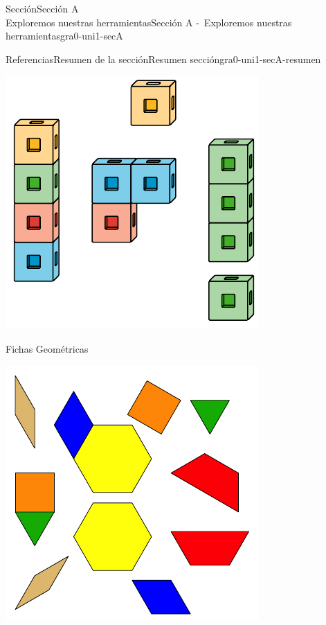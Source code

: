 \begin{sectionptx}{Sección}{{\Large Sección A\\}Exploremos nuestras herramientas}{}{Sección A -~Exploremos nuestras herramientas}{}{}{gra0-uni1-secA}
\begin{references-subsection}{Referencias}{Resumen de la sección}{}{Resumen sección}{}{}{gra0-uni1-secA-resumen}
\begin{sidebyside}{2}{0.05}{0.05}{0.1}
\begin{sbspanel}{0.4}
\includegraphics[max width=\linewidth, center]{external/svg-source/tikz-file-128850.pdf}
\end{sbspanel}%
\begin{sbspanel}{0.4}%
Fichas Geométricas%
\par
\includegraphics[max width=\linewidth, center]{external/svg-source/tikz-file-147344.pdf}

\end{sbspanel}
\end{sidebyside}
\end{references-subsection}
\end{sectionptx}
